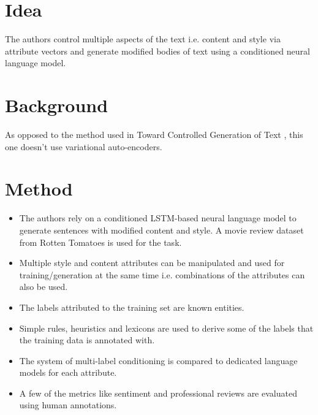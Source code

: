 \documentclass[12pt]{article}
\begin{document}
\title{}
\author{}
\date{}
\maketitle

\section{Idea}
  The authors control multiple aspects of the text i.e. content and style via attribute vectors and generate modified bodies of text using a conditioned neural language model.

\section{Background}
  As opposed to the method used in Toward Controlled Generation of Text \cite{hu2017toward}, this one doesn't use variational auto-encoders.

\section{Method}
  \begin{itemize}
    \item The authors rely on a conditioned LSTM-based neural language model to generate sentences with modified content and style. A movie review dataset from Rotten Tomatoes is used for the task.
    \item Multiple style and content attributes can be manipulated and used for training/generation at the same time i.e. combinations of the attributes can also be used.
    \item The labels attributed to the training set are known entities.
    \item Simple rules, heuristics and lexicons are used to derive some of the labels that the training data is annotated with.
    \item The system of multi-label conditioning is compared to dedicated language models for each attribute.
    \item A few of the metrics like sentiment and professional reviews are evaluated using human annotations.
  \end{itemize}
\end{document}
